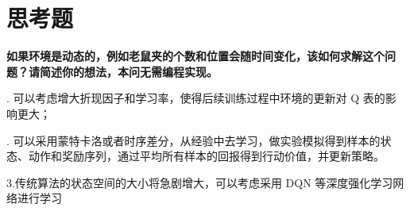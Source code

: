 \documentclass[lang=cn,a4paper]{elegantpaper}
\begin{document}
\section{思考题}

\noindent \textbf{如果环境是动态的，例如老鼠夹的个数和位置会随时间变化，该如何求解这个问题？请简述你的想法，本问无需编程实现。}


. 可以考虑增大折现因子和学习率，使得后续训练过程中环境的更新对 Q 表的影响更大；

. 可以采用蒙特卡洛或者时序差分，从经验中去学习，做实验模拟得到样本的状态、动作和奖励序列，通过平均所有样本的回报得到行动价值，并更新策略。

\noindent 3.传统算法的状态空间的大小将急剧增大，可以考虑采用 DQN 等深度强化学习网络进行学习












\nocite{*}
\printbibliography[heading=bibintoc, title=\ebibname]

\appendix
\addappheadtotoc
\end{document}
